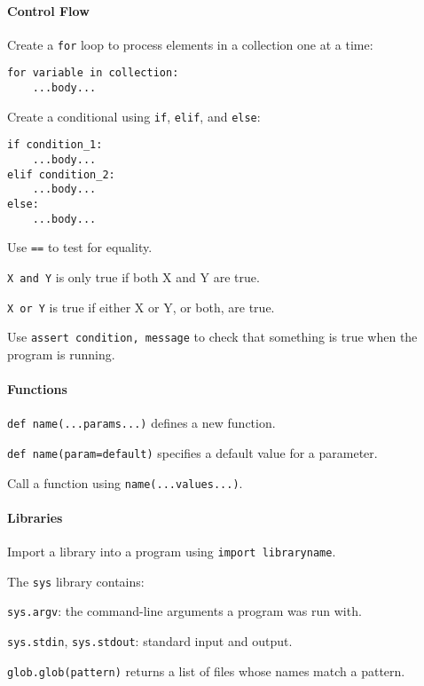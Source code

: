\documentclass{book}
\begin{document}
\mbox{}\paragraph{Control Flow}

\begin{swcitemize}
\item
  Create a \texttt{for} loop to process elements in a collection one at
  a time:

\begin{Verbatim}
for variable in collection:
    ...body...
\end{Verbatim}
\item
  Create a conditional using \texttt{if}, \texttt{elif}, and
  \texttt{else}:

\begin{Verbatim}
if condition_1:
    ...body...
elif condition_2:
    ...body...
else:
    ...body...
\end{Verbatim}
\item
  Use \texttt{==} to test for equality.
\item
  \texttt{X and Y} is only true if both X and Y are true.
\item
  \texttt{X or Y} is true if either X or Y, or both, are true.
\item
  Use \texttt{assert condition, message} to check that something is true
  when the program is running.
\end{swcitemize}

\mbox{}\paragraph{Functions}

\begin{swcitemize}
\item
  \texttt{def name(...params...)} defines a new function.
\item
  \texttt{def name(param=default)} specifies a default value for a
  parameter.
\item
  Call a function using \texttt{name(...values...)}.
\end{swcitemize}

\mbox{}\paragraph{Libraries}

\begin{swcitemize}
\item
  Import a library into a program using \texttt{import libraryname}.
\item
  The \texttt{sys} library contains:

  \begin{swcitemize2}
  \item
    \texttt{sys.argv}: the command-line arguments a program was run
    with.
  \item
    \texttt{sys.stdin}, \texttt{sys.stdout}: standard input and output.
   \end{swcitemize2}
\item
  \texttt{glob.glob(pattern)} returns a list of files whose names match
  a pattern.
\end{swcitemize}
\end{document}
